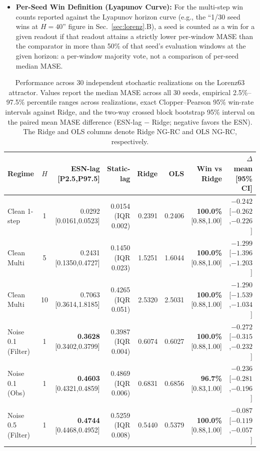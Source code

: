 \documentclass[aip,cha,reprint,amsmath,amssymb]{revtex4-2}
\begin{document}
\begin{itemize}
    \item \textbf{Per-Seed Win Definition (Lyapunov Curve):} For the multi-step win counts reported against the Lyapunov horizon curve (e.g., the ``1/30 seed wins at $H=40$'' figure in Sec.~\ref{sec:lorenz}.B), a seed is counted as a win for a given readout if that readout attains a strictly lower per-window MASE than the comparator in more than 50\% of that seed's evaluation windows at the given horizon: a per-window majority vote, not a comparison of per-seed median MASE.
\end{itemize}

\begin{table}[t]
\centering
\caption{Performance across 30 independent stochastic realizations on the Lorenz63 attractor. Values report the median MASE across all 30 seeds, empirical 2.5\%--97.5\% percentile ranges across realizations, exact Clopper--Pearson 95\% win-rate intervals against Ridge, and the two-way crossed block bootstrap 95\% interval on the paired mean MASE difference (ESN-lag $-$ Ridge; negative favors the ESN). The Ridge and OLS columns denote Ridge NG-RC and OLS NG-RC, respectively.}
\label{tab:30seeds_rigorous}
\begin{ruledtabular}
\scriptsize
\setlength{\tabcolsep}{2.5pt}
\begin{tabular}{lcrrrrrr}
Regime & $H$ & ESN-lag [P2.5,P97.5] & Static-lag & Ridge & OLS & Win vs Ridge & $\Delta$ mean [95\% CI] \\
\midrule
Clean 1-step & 1 & 0.0292 [0.0161,0.0523] & 0.0154 (IQR 0.002) & 0.2391 & 0.2406 & \textbf{100.0\%} [0.88,1.00] & $-0.242$ [$-0.262$,$-0.226$] \\
Clean Multi & 5 & 0.2431 [0.1350,0.4727] & 0.1450 (IQR 0.023) & 1.5251 & 1.6044 & \textbf{100.0\%} [0.88,1.00] & $-1.299$ [$-1.396$,$-1.203$] \\
Clean Multi & 10 & 0.7063 [0.3614,1.8185] & 0.4265 (IQR 0.051) & 2.5320 & 2.5031 & \textbf{100.0\%} [0.88,1.00] & $-1.290$ [$-1.539$,$-1.034$] \\
\midrule
Noise 0.1 (Filter) & 1 & \textbf{0.3628} [0.3402,0.3799] & 0.3987 (IQR 0.004) & 0.6074 & 0.6027 & \textbf{100.0\%} [0.88,1.00] & $-0.272$ [$-0.315$,$-0.232$] \\
Noise 0.1 (Obs) & 1 & \textbf{0.4603} [0.4321,0.4859] & 0.4869 (IQR 0.006) & 0.6831 & 0.6856 & \textbf{96.7\%} [0.83,1.00] & $-0.236$ [$-0.281$,$-0.196$] \\
Noise 0.5 (Filter) & 1 & \textbf{0.4744} [0.4468,0.4952] & 0.5259 (IQR 0.008) & 0.5440 & 0.5379 & \textbf{100.0\%} [0.88,1.00] & $-0.087$ [$-0.119$,$-0.057$] \\

\end{tabular}
\end{ruledtabular}
\end{table}
\end{document}

